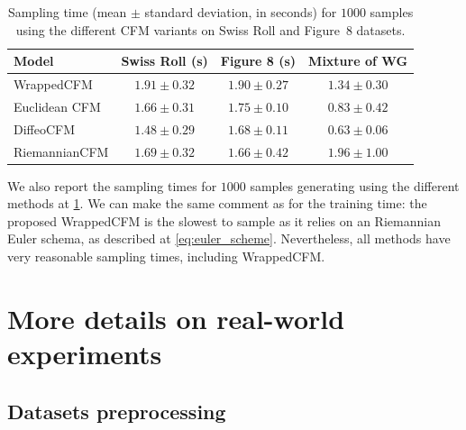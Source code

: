 \documentclass[10pt]{article} %
\theoremstyle{plain}
\theoremstyle{definition}
\theoremstyle{remark}
\begin{document}
\begin{table}[ht]
  \centering
  \small
  \setlength{\tabcolsep}{8pt}
  \begin{tabular}{lccc}
    \toprule
    \textbf{Model}
    & \textbf{Swiss Roll (s)}
    & \textbf{Figure 8 (s)}
    & \textbf{Mixture of WG}\\
    \midrule
    WrappedCFM
    & $1.91 \pm 0.32$
    & $1.90 \pm 0.27$
    &$1.34 \pm 0.30$\\

    Euclidean CFM
    & $1.66 \pm 0.31$
    & $1.75 \pm 0.10$
    &$0.83     \pm  0.42$\\

    DiffeoCFM
    & $\mathbf{1.48} \pm 0.29$
    & $1.68 \pm 0.11$
    &$\mathbf{0.63}    \pm   0.06$\\

    RiemannianCFM
    & $1.69 \pm 0.32$
    & $\mathbf{1.66} \pm 0.42$
    &$1.96     \pm  1.00$\\
    \bottomrule
  \end{tabular}
  \caption{Sampling time (mean $\pm$ standard deviation, in seconds) for $1000$ samples using the different CFM variants on Swiss Roll and Figure~8 datasets.}
  \label{tab:sampling_time}
\end{table}
We also report the sampling times for $1000$ samples generating using the different methods at \cref{tab:sampling_time}. We can make the same comment as for the training time: the proposed WrappedCFM is the slowest to sample as it relies on an Riemannian Euler schema, as described at \cref{eq:euler_scheme}. Nevertheless, all methods have very reasonable sampling times, including WrappedCFM.
\section{More details on real-world experiments}

\subsection{Datasets preprocessing}
\label{appendix:datasets_preprocessing}
\end{document}
